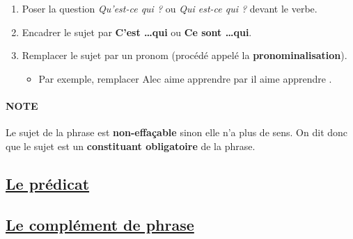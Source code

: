 \documentclass[10pt, french]{article}
\begin{document}
\begin{multicols*}{2}
\begin{astuces}
\begin{enumerate}[leftmargin = *]
	\item	Poser la question \textit{Qu'est-ce qui ?} ou \textit{Qui est-ce qui ?} devant le verbe.
	\item	Encadrer le sujet par \textbf{C'est \dots qui} ou \textbf{Ce sont \dots qui}.
	\item	Remplacer le sujet par un pronom (procédé appelé la \textbf{pronominalisation}).﻿
		\begin{itemize}[leftmargin = *]
		\item	Par exemple, remplacer \og Alec aime apprendre \fg{} par \og il aime apprendre \fg{}.
		\end{itemize}
\end{enumerate}
\end{astuces}

\paragraph{NOTE}	Le sujet de la phrase est \textbf{non-effaçable} sinon elle n'a plus de sens. On  dit donc que le sujet est un \textbf{constituant obligatoire} de la phrase.


\subsection*{\href{http://www.alloprof.qc.ca/BV/Pages/f1131.aspx}{Le prédicat}}

\subsection*{\href{http://www.alloprof.qc.ca/BV/Pages/f1132.aspx}{Le complément de phrase}}




\end{multicols*}
\end{document}
